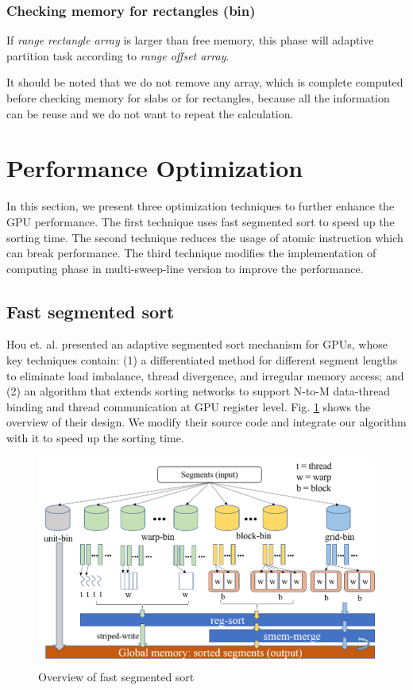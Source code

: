 \subsubsection{Checking memory for rectangles (bin)}
If \textit{range rectangle array} is larger than free memory, this phase will adaptive partition task according to \textit{range offset array}.

It should be noted that we do not remove any array, which is complete computed before checking memory for slabs or for rectangles, because all the information can be reuse and we do not want to repeat the calculation.

\section{Performance Optimization}
In this section, we present three optimization techniques to further enhance the GPU performance. The first technique uses fast segmented sort to speed up the sorting time. The second technique reduces the usage of atomic instruction which can break performance. The third technique modifies the implementation of computing phase in multi-sweep-line version to improve the performance.
\subsection{Fast segmented sort}
Hou et. al. \cite{Hou2017FastSS} presented an adaptive segmented sort mechanism for GPUs, whose key techniques contain: (1) a differentiated method for different segment lengths to eliminate load imbalance, thread divergence, and irregular memory access; and (2) an algorithm that extends sorting networks to support N-to-M data-thread binding and thread communication at GPU register level. Fig. \ref{fig:fig_4_1} shows the overview of their design. We modify their source code and integrate our algorithm with it to speed up the sorting time.
\begin{figure}[h]
    \centering
    \includegraphics[scale=0.4]{image/fig_4_1.png}
    \caption{Overview of fast segmented sort}
    \label{fig:fig_4_1}
\end{figure}

